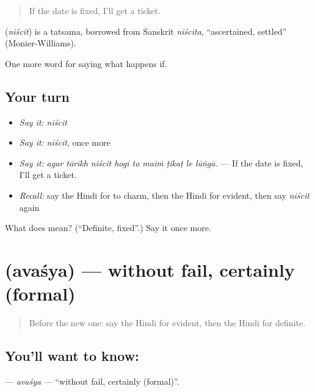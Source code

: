 \begin{quote}
If the date is fixed, I'll get a ticket.
\end{quote}

\begin{cousinweb}
\textbf{} (\emph{niścit}) is a tatsama, borrowed from Sanskrit \emph{niścita}, \textquotedblleft{}ascertained, settled\textquotedblright{} (Monier-Williams).
\end{cousinweb}

\begin{grammarlens}[title={What you've built}]
One more word for saying what happens if.
\end{grammarlens}

\subsection*{Your turn}
\begin{itemize}
\raggedright
  \item \emph{Say it:} \emph{niścit}
  \item \emph{Say it:} \emph{niścit}, once more
  \item \emph{Say it:} \emph{agar tārīkh niścit hogī to maiṁ ṭikaṭ le lūṅgā.} — If the date is fixed, I'll get a ticket.
  \item \emph{Recall:} say the Hindi for to charm, then the Hindi for evident, then say \emph{niścit} again
\end{itemize}

\begin{tcolorbox}[breakable,colback=teal!4,colframe=teal!35!black,title={Before you move on}]
What does  mean? (\textquotedblleft{}Definite, fixed\textquotedblright{}.) Say it once more.
\end{tcolorbox}
\section[\texorpdfstring{\hi{अवश्य} (avaśya)}{अवश्य (avaśya)}]{ (avaśya) — without fail, certainly (formal)}

\label{lesson:HI-C376-avasya}



\begin{quote}
Before the new one: say the Hindi for evident, then the Hindi for definite.
\end{quote}

\subsection*{You'll want to know: }
\textbf{} — \emph{avaśya} — \textquotedblleft{}without fail, certainly (formal)\textquotedblright{}.

